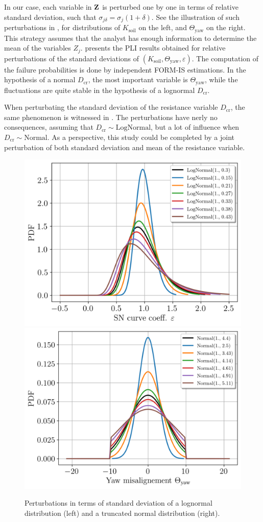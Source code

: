 In our case, each variable in ${\bf Z}$ is perturbed one by one in terms of relative standard deviation, such that $\sigma_{j \delta} = \sigma_j (1+\delta)$. 
See the illustration of such perturbations in , for distributions of $K_{\mathrm{soil}}$ on the left, and $\Theta_{\mathrm{yaw}}$ on the right.
This strategy assumes that the analyst has enough information to determine the mean of the variables $Z_j$. 
 presents the PLI results obtained for relative perturbations of the standard deviations of $(K_{\mathrm{soil}}, \Theta_{\mathrm{yaw}}, \varepsilon)$. 
The computation of the failure probabilities is done by independent FORM-IS estimations. 
In the hypothesis of a normal $D_{\mathrm{cr}}$, the most important variable is $\Theta_{\mathrm{yaw}}$, while the fluctuations are quite stable in the hypothesis of a lognormal $D_{\mathrm{cr}}$. 

When perturbating the standard deviation of the resistance variable $D_{\mathrm{cr}}$, the same phenomenon is witnessed in . 
The perturbations have nerly no consequences, assuming that $D_{\mathrm{cr}}\sim \mathrm{LogNormal}$, but a lot of influence when $D_{\mathrm{cr}}\sim \mathrm{Normal}$.  
As a perspective, this study could be completed by a joint perturbation of both standard deviation and mean of the resistance variable.


\begin{figure}
    \centering
        \includegraphics[width=0.43\linewidth]{./part3/figures/OWT/lognormal_pert.png}
        \includegraphics[width=0.44\linewidth]{./part3/figures/OWT/normal_pert.png}
    \caption{Perturbations in terms of standard deviation of a lognormal distribution (left) and a truncated normal distribution (right).}
    \label{fig:perturbations}
\end{figure}


